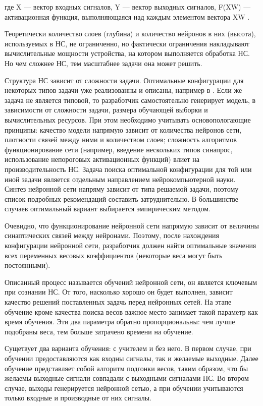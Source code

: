 \documentclass[a4paper,english,russian]{G2-105}
\begin{document}
где X --- вектор входных сигналов, Y --- вектор выходных сигналов, F(XW) --- активационная функция, выполняющаяся над каждым элементом вектора XW \cite{12}.
\par Теоретически количество слоев (глубина) и количество нейронов в них (высота), используемых в НС, не ограниченно, но фактически ограничения накладывают вычислительные мощности устройства, на котором выполняется обработка НС. Но чем сложнее НС, тем масштабнее задачи она может решить. 
\par Структура НС зависит от сложности задачи. Оптимальные конфигурации для некоторых типов задачи уже реализованны и описаны, например в \cite{13}. Если же задача не является типовой, то разработчик самостоятельно генерирует модель, в зависимости от сложности задачи, размера обучающей выборки и вычислительных ресурсов. При этом необходимо учитывать основопологающие принципы: качество модели напрямую зависит от количества нейронов сети, плотности связей между ними и количеством слоев; сложность алгоритмов функционирование сети (например, введение нескольких типов синапрос, использование непороговых активационных функций) влиет на производительность НС. Задача поиска оптимальной конфигурации для той или иной задачи является отдельным направлением нейрокомпьютерной науки. Синтез нейронной сети напряму зависит от типа решаемой задачи, поэтому список подробных рекомендаций составить затруднительно. В большинстве случаев оптимальный вариант выбирается эмпирическим методом.
\par Очевидно, что функционирование нейронной сети напрямую зависит от величины синаптических связей между нейронами. Поэтому, после нахождения конфигурации нейронной сети, разработчик должен найти оптимальные значения всех переменных весовых коэффициентов (некоторые веса могут быть постоянными).
\par Описанный процесс называется обучений нейронной сети, он является ключевым при сознании НС. От того, насколько хорошо он будет выполнен, зависит качество решений поставленных задачь перед нейронных сетей. На этапе обучение кроме качества поиска весов важное место занимает такой параметр как время обучения. Эти два параметра обратно пропорциональны: чем лучше подобраны веса, тем больше затрачено времени на обучение.
\par Сущетвует два варианта обучения: с учителем и без него. В первом случае, при обучении предоставляются как входны сигналы, так и желаемые выходные. Далее обучение представляет собой алгоритм подгонки весов, таким образом, что бы желаемы выходные сигнали совпадали с выходными сигналами НС. Во втором случае, выходы генерируется нейронной сетью, а при обучении учитываются только входные и производные от них сигналы.
\end{document}
